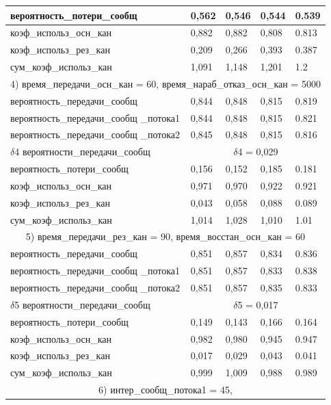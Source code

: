 \begin{longtable} {
	|p{}
	|p{}
	|p{}
	|p{}
	|p{}
	|}
	вероятность\_потери\_сообщ & 0,562 & 0,546 & 0,544 & 0.539 \\ \hline
	коэф\_использ\_осн\_кан & 0,882 & 0,882 & 0,808 & 0.813 \\ \hline
	коэф\_использ\_рез\_кан & 0,209 & 0,266 & 0,393 & 0.387 \\ \hline
	сум\_коэф\_использ\_кан & 1,091 & 1,148 & 1,201 & 1.2 \\ \hline
	\multicolumn{5}{|c|}{4) время\_передачи\_осн\_кан = 60,
		время\_нараб\_отказ\_осн\_кан = 5000} \\ \hline
	вероятность\_передачи\_сообщ & 0,844 & 0,848 & 0,815 & 0.819 \\ \hline
	вероятность\_передачи\_сообщ \_потока1 & 0,844 & 0,848
		& 0,815 & 0.821 \\ \hline
	вероятность\_передачи\_сообщ \_потока2 & 0,845 & 0,848
		& 0,815 & 0.816 \\ \hline
	$\delta$4 вероятности\_передачи\_сообщ &
		\multicolumn{4}{|c|}{$\delta$4 = 0,029} \\ \hline
	вероятность\_потери\_сообщ & 0,156 & 0,152 & 0,185 & 0.181 \\ \hline
	коэф\_использ\_осн\_кан & 0,971 & 0,970 & 0,922 & 0.921 \\ \hline
	коэф\_использ\_рез\_кан & 0,043 & 0,058 & 0,088 & 0.089 \\ \hline
	сум\_коэф\_использ\_кан & 1,014 & 1,028 & 1,010 & 1.01 \\ \hline
	\multicolumn{5}{|c|}{5) время\_передачи\_рез\_кан = 90,
		время\_восстан\_осн\_кан = 60} \\ \hline
	вероятность\_передачи\_сообщ & 0,851 & 0,857 & 0,834 & 0.836 \\ \hline
	вероятность\_передачи\_сообщ \_потока1 & 0,851 & 0,857
		& 0,833 & 0.838 \\ \hline
	вероятность\_передачи\_сообщ \_потока2 & 0,851 & 0,857
		& 0,835 & 0.833 \\ \hline
	$\delta$5 вероятности\_передачи\_сообщ &
		\multicolumn{4}{|c|}{$\delta$5 = 0,017} \\ \hline
	вероятность\_потери\_сообщ & 0,149 & 0,143 & 0,166 & 0.164 \\ \hline
	коэф\_использ\_осн\_кан & 0,982 & 0,980 & 0,945 & 0.947 \\ \hline
	коэф\_использ\_рез\_кан & 0,017 & 0,029 & 0,043 & 0.041 \\ \hline
	сум\_коэф\_использ\_кан & 0,999 & 1,009 & 0,988 & 0.989 \\ \hline
	\multicolumn{5}{|c|}{6) интер\_сообщ\_потока1 = 45,
}
\end{longtable}
